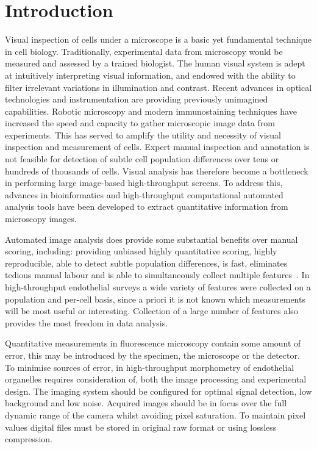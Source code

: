 \section{Introduction}
\label{endothelial_morphometry:introduction}
Visual inspection of cells under a microscope is a basic yet fundamental technique in cell biology. Traditionally, experimental data from microscopy would be measured and assessed by a trained biologist. The human visual system is adept at intuitively interpreting visual information, and endowed with the ability to filter irrelevant variations in illumination and contrast. Recent advances in optical technologies and instrumentation are providing previously unimagined capabilities. Robotic microscopy and modern immunostaining techniques have increased the speed and capacity to gather microscopic image data from experiments. This has served to amplify the utility and necessity of visual inspection and measurement of cells. Expert manual inspection and annotation is not feasible for detection of subtle cell population differences over tens or hundreds of thousands of cells. Visual analysis has therefore become a bottleneck in performing large image-based high-throughput screens. To address this, advances in bioinformatics and high-throughput computational automated analysis tools have been developed to extract quantitative information from microscopy images.

Automated image analysis does provide some substantial benefits over manual scoring, including: providing unbiased highly quantitative scoring, highly reproducible, able to detect subtle population differences, is fast, eliminates tedious manual labour and is able to simultaneously collect multiple features~\cite{Jones2006}. In high-throughput endothelial surveys a wide variety of features were collected on a population and per-cell basis, since a priori it is not known which measurements will be most useful or interesting. Collection of a large number of features also provides the most freedom in data analysis.

Quantitative measurements in fluorescence microscopy contain some amount of error, this may be introduced by the specimen, the microscope or the detector. To minimise sources of error, in high-throughput morphometry of endothelial organelles requires consideration of, both the image processing and experimental design. The imaging system should be configured for optimal signal detection, low background and low noise. Acquired images should be in focus over the full dynamic range of the camera whilst avoiding pixel saturation. To maintain pixel values digital files must be stored in original raw format or using lossless compression.

